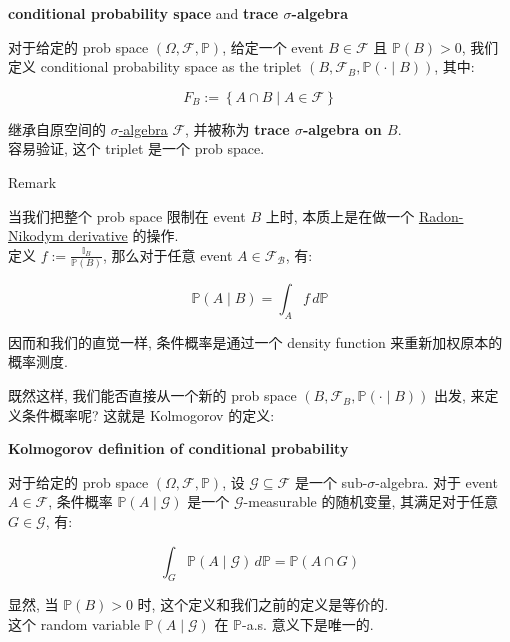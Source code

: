 \documentclass{qlnotes-export}
\begin{document}
\begin{definition}{\protect{}\label{kn-conditional-probability-space-and-trace-sigma-algebra}{\textbf{conditional
probability space}} and
\protect{}\label{kn-trace-sigma-algebra}{\textbf{trace
\(\sigma\)-algebra}}}

对于给定的 prob space \((\Omega,\mathcal{F},{\mathbb{P}})\), 给定一个 event \(B \in \mathcal{F}\) 且 \({\mathbb{P}}(B) > 0\), 我们定义 conditional probability space as the triplet \((B,\mathcal{F}_{B},{\mathbb{P}}( \cdot \mid B))\), 其中:

\[F_{B} := \left\{ {A \cap B \mid A \in \mathcal{F}} \right\}\]

继承自原空间的 \href{https://qiulinfan.github.io/notes/math/measure-theory/\#kn-sigma-algebra}{\(\sigma\)-algebra} \(\mathcal{F}\), 并被称为 \textbf{trace \(\sigma\)-algebra on \(B\)}.\\
容易验证, 这个 triplet 是一个 prob space.

\end{definition}

\begin{qlremark}{Remark}

当我们把整个 prob space 限制在 event \(B\) 上时, 本质上是在做一个 \href{https://qiulinfan.github.io/notes/math/measure-theory/\#kn-radon-nikodym-derivative}{Radon-Nikodym derivative} 的操作.\\
定义 \(f := \frac{{\mathbb{I}}_{B}}{{\mathbb{P}}(B)}\), 那么对于任意 event \(A \in \mathcal{F}_{\mathcal{B}}\), 有:

\[{\mathbb{P}}(A \mid B) = \int_{A}f\, d{\mathbb{P}}\]

因而和我们的直觉一样, 条件概率是通过一个 density function 来重新加权原本的概率测度.

\end{qlremark}

既然这样, 我们能否直接从一个新的 prob space \((B,\mathcal{F}_{B},{\mathbb{P}}( \cdot \mid B))\) 出发, 来定义条件概率呢? 这就是 Kolmogorov 的定义:

\begin{definition}{\protect{}\label{kn-kolmogorov-definition-of-conditional-probability}{\textbf{Kolmogorov
definition of conditional probability}}}

对于给定的 prob space \((\Omega,\mathcal{F},{\mathbb{P}})\), 设 \(\mathcal{G} \subseteq \mathcal{F}\) 是一个 sub-\(\sigma\)-algebra. 对于 event \(A \in \mathcal{F}\), 条件概率 \({\mathbb{P}}(A \mid \mathcal{G})\) 是一个 \(\mathcal{G}\)-measurable 的随机变量, 其满足对于任意 \(G \in \mathcal{G}\), 有:

\[\int_{G}{\mathbb{P}}(A \mid \mathcal{G})\, d{\mathbb{P}} = {\mathbb{P}}(A \cap G)\]

显然, 当 \({\mathbb{P}}(B) > 0\) 时, 这个定义和我们之前的定义是等价的.\\
这个 random variable \({\mathbb{P}}(A \mid \mathcal{G})\) 在 \(\mathbb{P}\)-a.s. 意义下是唯一的.

\end{definition}
\end{document}
